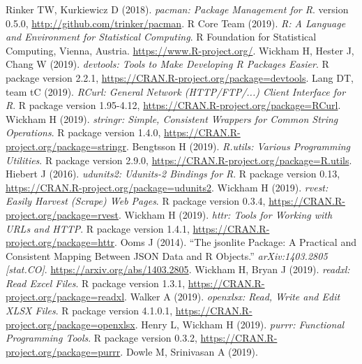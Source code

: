 Rinker TW, Kurkiewicz D (2018).
\emph{pacman: Package Management for R}.
version 0.5.0, \url{http://github.com/trinker/pacman}.
\newline R Core Team (2019).
\emph{R: A Language and Environment for Statistical Computing}.
R Foundation for Statistical Computing, Vienna, Austria.
\url{https://www.R-project.org/}.
\newline Wickham H, Hester J, Chang W (2019).
\emph{devtools: Tools to Make Developing R Packages Easier}.
R package version 2.2.1, \url{https://CRAN.R-project.org/package=devtools}.
\newline Lang DT, team tC (2019).
\emph{RCurl: General Network (HTTP/FTP/...) Client Interface for R}.
R package version 1.95-4.12, \url{https://CRAN.R-project.org/package=RCurl}.
\newline Wickham H (2019).
\emph{stringr: Simple, Consistent Wrappers for Common String Operations}.
R package version 1.4.0, \url{https://CRAN.R-project.org/package=stringr}.
\newline Bengtsson H (2019).
\emph{R.utils: Various Programming Utilities}.
R package version 2.9.0, \url{https://CRAN.R-project.org/package=R.utils}.
\newline Hiebert J (2016).
\emph{udunits2: Udunits-2 Bindings for R}.
R package version 0.13, \url{https://CRAN.R-project.org/package=udunits2}.
\newline Wickham H (2019).
\emph{rvest: Easily Harvest (Scrape) Web Pages}.
R package version 0.3.4, \url{https://CRAN.R-project.org/package=rvest}.
\newline Wickham H (2019).
\emph{httr: Tools for Working with URLs and HTTP}.
R package version 1.4.1, \url{https://CRAN.R-project.org/package=httr}.
\newline Ooms J (2014).
``The jsonlite Package: A Practical and Consistent Mapping Between JSON Data and R Objects.''
\emph{arXiv:1403.2805 [stat.CO]}.
\url{https://arxiv.org/abs/1403.2805}.
\newline Wickham H, Bryan J (2019).
\emph{readxl: Read Excel Files}.
R package version 1.3.1, \url{https://CRAN.R-project.org/package=readxl}.
\newline Walker A (2019).
\emph{openxlsx: Read, Write and Edit XLSX Files}.
R package version 4.1.0.1, \url{https://CRAN.R-project.org/package=openxlsx}.
\newline Henry L, Wickham H (2019).
\emph{purrr: Functional Programming Tools}.
R package version 0.3.2, \url{https://CRAN.R-project.org/package=purrr}.
\newline Dowle M, Srinivasan A (2019).
